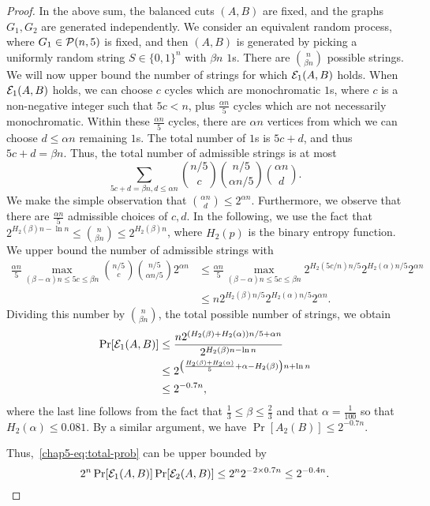 \begin{proof}
In the above sum, the balanced cuts $(A,B)$ are fixed, and the graphs $G_1, G_2$ are generated independently. We consider an equivalent random process, where $G_1 \in \mathcal{P}(n,5)$ is fixed, and then $(A,B)$ is generated by picking a uniformly random string $S \in \{0,1\}^n$ with $\beta n$ $1$s. There are $\binom{n}{\beta n}$ possible strings. We will now upper bound the number of strings for which $\mathcal{E}_1(A,B)$ holds. When $\mathcal{E}_1(A,B)$ holds, we can choose $c$ cycles which are monochromatic $1$s, where $c$ is a non-negative integer such that $5c < n$, plus $\frac{\alpha n}{5}$ cycles which are not necessarily monochromatic. Within these $\frac{\alpha n}{5}$ cycles, there are $\alpha n$ vertices from which we can choose $d \leq \alpha n$ remaining $1$s. The total number of $1$s is $5c + d$, and thus $5c + d = \beta n$. Thus, the total number of admissible strings is at most 
\[
    \sum_{5c + d = \beta n, d \leq \alpha n}\binom{n/5}{c} \binom{n/5}{\alpha n / 5} \binom{\alpha n}{d}.
\]
We make the simple observation that $\binom{\alpha n}{d} \leq 2^{\alpha n}$. Furthermore, we observe that there are $\frac{\alpha n}{5}$ admissible choices of $c,d$. In the following, we use the fact that $2^{H_2(\beta) n - \ln n} \leq \binom{n}{\beta n} \leq 2^{H_2(\beta) n}$, where $H_2(p)$ is the binary entropy function. We upper bound the number of admissible strings with
\begin{align*}
    \frac{\alpha n}{5} \max_{(\beta-\alpha) n \leq 5c \leq \beta n} \binom{n/5}{c} \binom{n/5}{\alpha n / 5} 2^{\alpha n} &\leq 
    \frac{\alpha n}{5} \max_{(\beta - \alpha) n \leq 5c \leq \beta n} 2^{H_2(5c/n)n/5} 2^{H_2(\alpha)n/5}2^{\alpha n} \\ 
    &\leq n 2^{H_2(\beta)n/5} 2^{H_2(\alpha)n/5} 2^{\alpha n}.
\end{align*}
Dividing this number by $\binom{n}{\beta n}$, the total possible number of strings, we obtain
\begin{align*}
    \Pr[\mathcal{E}_1(A,B)] &\leq \frac{n 2^{(H_2(\beta) + H_2(\alpha)) n / 5 + \alpha n}}{2^{H_2(\beta)n - \ln n}} \\
    &\leq 2^{\left(\frac{H_2(\beta) + H_2(\alpha)}{5} + \alpha - H_2(\beta) \right) n  + \ln n } \\
    &\leq 2^{-0.7 n},
\end{align*}
where the last line follows from the fact that $\frac{1}{3} \leq \beta \leq \frac{2}{3}$ and that $\alpha = \frac{1}{100}$ so that $H_2(\alpha) \leq 0.081$.
By a similar argument, we have $\Pr[A_2(B)] \leq 2^{-0.7 n}$.

Thus,~\eqref{chap5-eq:total-prob} can be upper bounded by
\[
    2^{n} \Pr[\mathcal{E}_1(A,B)] \Pr[\mathcal{E}_2(A,B)] \leq 2^{n} 2^{-2 \times 0.7 n} \leq 2^{-0.4n}.
\]

\end{proof}

